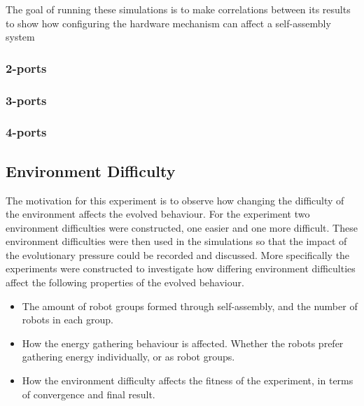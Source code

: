 The goal of running these simulations is to make correlations between its results to show how configuring the hardware mechanism can affect a self-assembly system
 
\subsubsection{2-ports}
\newpage



\newpage

\subsubsection{3-ports}

\newpage



\newpage

\subsubsection{4-ports}

\newpage



\newpage

\subsection{Environment Difficulty}
The motivation for this experiment is to observe how changing the difficulty of the environment affects the evolved behaviour.
For the experiment two environment difficulties were constructed, one easier and one more difficult.
These environment difficulties were then used in the simulations so that the impact of the evolutionary pressure could be recorded and discussed.
More specifically the experiments were constructed to investigate how differing environment difficulties affect the following properties of the evolved behaviour.

\begin{itemize}
	\item The amount of robot groups formed through self-assembly, and the number of robots in each group.
	\item How the energy gathering behaviour is affected. Whether the robots prefer gathering energy individually, or as robot groups. 
	\item How the environment difficulty affects the fitness of the experiment, in terms of convergence and final result.
\end{itemize}


